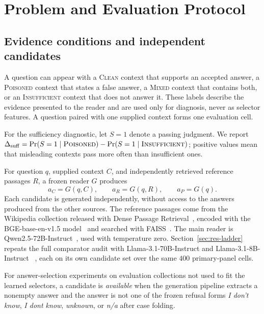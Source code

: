 \documentclass[sigconf]{acmart}
\newcommand{\cpoison}{\textsc{Poisoned}}
\newcommand{\cclean}{\textsc{Clean}}
\newcommand{\cmixed}{\textsc{Mixed}}
\newcommand{\cinsuf}{\textsc{Insufficient}}
\newcommand{\ac}{a_C}
\newcommand{\ar}{a_R}
\newcommand{\ap}{a_P}
\begin{document}
\section{Problem and Evaluation Protocol}
\label{sec:setup}

\subsection{Evidence conditions and independent candidates}

A question can appear with a \cclean{} context that supports an
accepted answer, a \cpoison{} context that states a false answer, a
\cmixed{} context that contains both, or an \cinsuf{} context that
does not answer it. These labels describe the evidence presented to
the reader and are used only for diagnosis, never as selector
features. A question paired with one supplied context forms one
evaluation cell.

For the sufficiency diagnostic, let $S=1$ denote a passing judgment. We
report $\Delta_{\mathrm{suff}}
=\Pr(S=1\mid\cpoison)-\Pr(S=1\mid\cinsuf)$; positive values mean that
misleading contexts pass more often than insufficient ones.

For question $q$, supplied context $C$, and independently retrieved
reference passages $R$, a frozen reader $G$ produces
\begin{equation}
  \ac=G(q,C), \qquad
  \ar=G(q,R), \qquad
  \ap=G(q).
  \label{eq:candidates}
\end{equation}
Each candidate is generated independently, without access to the
answers produced from the other sources. The reference passages come
from the Wikipedia collection released with Dense Passage
Retrieval~\cite{karpukhin2020dpr}, encoded with the
BGE-base-en-v1.5 model~\cite{xiao2023bge} and searched with
FAISS~\cite{johnson2019faiss}. The main reader is
Qwen2.5-72B-Instruct~\cite{qwen2024qwen25}, used with temperature
zero. Section~\ref{sec:res-ladder} repeats the full comparator audit
with Llama-3.1-70B-Instruct and Llama-3.1-8B-Instruct
~\cite{dubey2024llama3}, each on its own candidate set over the
same $400$ primary-panel cells.

For answer-selection experiments on evaluation collections not used to
fit the learned selectors, a candidate is \emph{available} when the generation pipeline extracts a nonempty
answer and the answer is not one of the frozen refusal forms
\emph{I don't know}, \emph{I dont know}, \emph{unknown}, or
\emph{n/a} after case folding.
\end{document}
